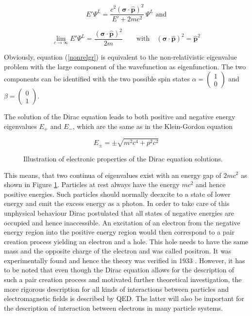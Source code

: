 \begin{equation}
E'\Psi^L = \frac{c^2(\mathbf{\sigma}\cdot\hat{\mathbf{p}})^2}{E'+2mc^2}\,\Psi^L\label{hamneu} \text{ and}
\end{equation}
   
\begin{equation}
\lim_{c\rightarrow\infty} E'\Psi^L = \frac{(\mathbf{\sigma}\cdot\hat{\mathbf{p}})^2}{2m} \qquad\text{with}\quad (\mathbf{\sigma}\cdot\hat{\mathbf{p}})^2=\hat{\mathbf{p}}^2\label{nonrelgr}
\end{equation}

Obviously, equation (\ref{nonrelgr}) is equivalent to the non-relativistic
eigenvalue problem with the large component of the wavefunction as eigenfunction.
The two components can be identified with the two possible spin states
$\alpha = \begin{pmatrix} 1\\0 \end{pmatrix}$ and
$\beta= \begin{pmatrix} 0\\1 \end{pmatrix}$.

The solution of the Dirac equation leads to both positive and negative energy
eigenvalues $E_+$ and $E_-$, which are the same as in the Klein-Gordon equation

\begin{equation}
E_\pm = \pm \sqrt{m^2c^4+p^2c^2}
\end{equation}

\begin{figure}
 \centering
 
 \caption{Illustration of electronic properties of the Dirac equation solutions.}
 \label{figure:dirac_solutions}
\end{figure}

This means, that two continua of eigenvalues exist with an energy gap of $2mc^2$
as shown in Figure \ref{figure:dirac_solutions}.
Particles at rest always have the energy $mc^2$ and hence positive energies.
Such particles should normally deexcite to a state of lower energy and emit
the excess energy as a photon. In order to take care of this unphysical behaviour
Dirac postulated that all states of negative energies are occupied and hence
inaccessible. An excitation of an electron from the negative energy region into
the positive energy region would then correspond to a pair creation process yielding
an electron and a hole. This hole needs to have the same mass and the opposite charge
of the electron and was called positron. It was experimentally found and hence the
theory was verified in 1933
\cite{Anderson33}. However, it has to be noted that even though the Dirac equation
allows for the description of such a pair creation process and motivated further
theoretical investigation, the more rigorous
description for all kinds of interactions between particles and electromagnetic
fields is described by \ac{QED}. The latter will also be important for the
description of interaction between electrons in many particle systems.



